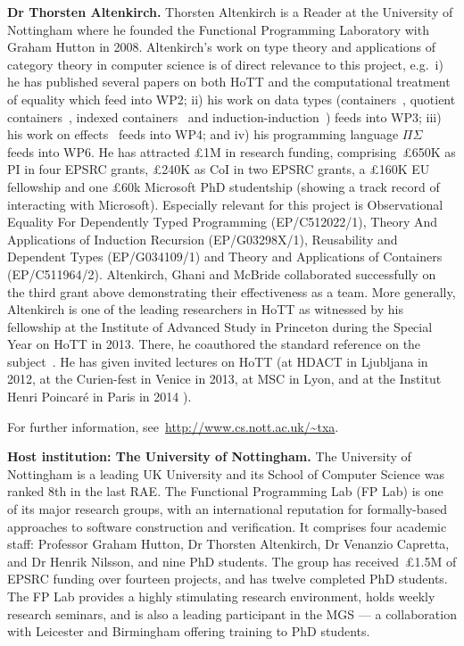 \documentclass[a4paper,11pt]{article}
\newcommand{\eg}{{e.g.}\ }
\begin{document}
\newpage \textbf{Dr Thorsten Altenkirch.}  Thorsten Altenkirch is a
Reader at the University of Nottingham where he founded the Functional
Programming Laboratory with Graham Hutton in 2008. Altenkirch's
work on type theory and applications of category theory
in computer science is of direct relevance to this project, \eg i) he has
published several papers on both HoTT and the computational treatment
of equality
\cite{altenkirch:extSetoids,alti:ott-conf,alti:csl12,alti:tlca13-hedberg}
which feed into WP2; ii) his work on data types 
(containers~\cite{alti:cont-tcs}, quotient
containers~\cite{alti:mpc04}, indexed
containers~\cite{altenkirchGhaniHancockMcBrideMorris:indexedContainers}
and
induction-induction~\cite{alti:catind2})
feeds into WP3; iii) his work on
effects~\cite{alti:beast} feeds into WP4; and iv) his programming
language $\Pi\Sigma$~\cite{alti:pisigma-new} feeds into WP6. He
has attracted \pounds 1M in research funding,
comprising~\pounds650K  as PI in four EPSRC grants, \pounds240K
as CoI in two EPSRC grants,  a \pounds160K EU fellowship and
one \pounds 60k Microsoft PhD 
studentship (showing a track record of interacting with
Microsoft). Especially relevant for this project is
Observational Equality For Dependently Typed Programming
(EP/C512022/1), Theory And Applications of Induction Recursion
(EP/G03298X/1), Reusability and Dependent Types (EP/G034109/1) and
Theory and Applications of Containers (EP/C511964/2).  Altenkirch,
Ghani and McBride collaborated successfully on the third grant above
demonstrating their effectiveness as a team. More
generally, Altenkirch is one of the leading researchers in HoTT as
witnessed by his fellowship at the Institute of Advanced Study in
Princeton during the Special Year on HoTT in 2013. There, he
coauthored the standard reference on the subject~\cite{hott-book}.  He
has given invited lectures on HoTT (at HDACT in Ljubljana in 2012, at
the Curien-fest in Venice in 2013, at MSC in Lyon, and at the Institut
Henri Poincar\'e in Paris in 2014 \cite{txa-ihp14}).

For further information, see~\url{http://www.cs.nott.ac.uk/~txa}.

\textbf{Host institution: The University of Nottingham.}  The
University of Nottingham is a leading UK University 
and its School of Computer Science was ranked 8th in the last RAE. The Functional Programming Lab (FP Lab)
is one of its major research groups, with an international
reputation for formally-based approaches to software
construction and verification.  It comprises four
academic staff: Professor Graham Hutton, Dr Thorsten Altenkirch, Dr
Venanzio Capretta, and Dr Henrik Nilsson, and nine PhD students.
The group has received~\pounds1.5M of EPSRC funding over fourteen
projects, and has twelve completed PhD students.
The FP Lab provides a highly stimulating research environment,
holds weekly research seminars, and is also a leading participant in the MGS
--- a collaboration with Leicester and Birmingham offering training
to PhD students.
\noindent
\end{document}
